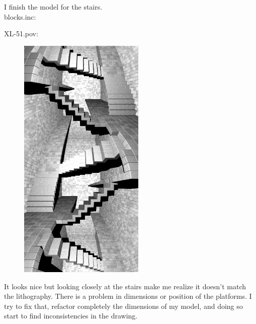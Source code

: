 \documentclass[12pt, a4paper]{article}
\begin{document}
I finish the model for the stairs.\\

blocks.inc:\\
\begin{scriptsize}
\begin{ttfamily}

\end{ttfamily}
\end{scriptsize}

XL-51.pov:\\
\begin{scriptsize}
\begin{ttfamily}

\end{ttfamily}
\end{scriptsize}

\begin{center}
\begin{figure}[H]
\centering
\includegraphics[width=6cm]{./XL-51_10.png}\\
\end{figure}
\end{center}

It looks nice but looking closely at the stairs make me realize it doesn't match the lithography. There is a problem in dimensions or position of the platforms. I try to fix that, refactor completely the dimensions of my model, and doing so start to find inconsistencies in the drawing.\\
\end{document}
